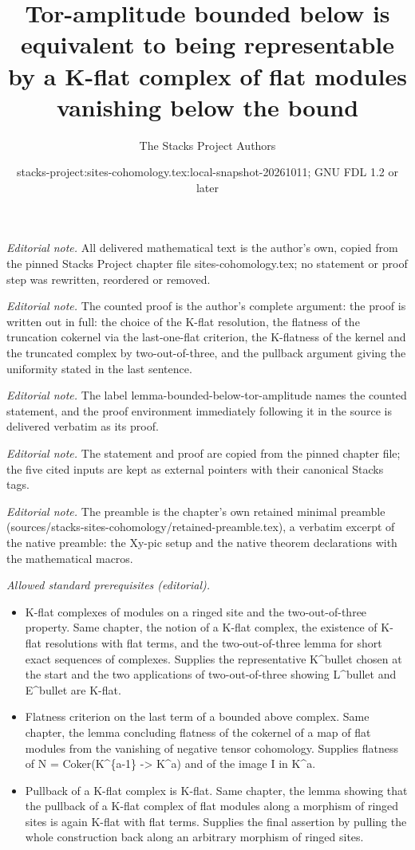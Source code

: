 \documentclass[10pt,a4paper]{amsart}
\title{Tor-amplitude bounded below is equivalent to being representable by a K-flat complex of flat modules vanishing below the bound}
\author{The Stacks Project Authors}
\date{stacks-project:sites-cohomology.tex:local-snapshot-20261011; GNU FDL 1.2 or later}
\theoremstyle{plain}
\theoremstyle{definition}
\theoremstyle{remark}
\numberwithin{equation}{subsection}
\begin{document}
\maketitle
\noindent\textit{Editorial note.} All delivered mathematical text is the author's own, copied from the pinned Stacks Project chapter file sites-cohomology.tex; no statement or proof step was rewritten, reordered or removed.\par\medskip
\noindent\textit{Editorial note.} The counted proof is the author's complete argument: the proof is written out in full: the choice of the K-flat resolution, the flatness of the truncation cokernel via the last-one-flat criterion, the K-flatness of the kernel and the truncated complex by two-out-of-three, and the pullback argument giving the uniformity stated in the last sentence.\par\medskip
\noindent\textit{Editorial note.} The label lemma-bounded-below-tor-amplitude names the counted statement, and the proof environment immediately following it in the source is delivered verbatim as its proof.\par\medskip
\noindent\textit{Editorial note.} The statement and proof are copied from the pinned chapter file; the five cited inputs are kept as external pointers with their canonical Stacks tags.\par\medskip
\noindent\textit{Editorial note.} The preamble is the chapter's own retained minimal preamble (sources/stacks-sites-cohomology/retained-preamble.tex), a verbatim excerpt of the native preamble: the Xy-pic setup and the native theorem declarations with the mathematical macros.\par\medskip
\noindent\textit{Allowed standard prerequisites (editorial).}\begin{itemize}
\item K-flat complexes of modules on a ringed site and the two-out-of-three property. Same chapter, the notion of a K-flat complex, the existence of K-flat resolutions with flat terms, and the two-out-of-three lemma for short exact sequences of complexes. Supplies the representative K\textasciicircum{}bullet chosen at the start and the two applications of two-out-of-three showing L\textasciicircum{}bullet and E\textasciicircum{}bullet are K-flat.
\item Flatness criterion on the last term of a bounded above complex. Same chapter, the lemma concluding flatness of the cokernel of a map of flat modules from the vanishing of negative tensor cohomology. Supplies flatness of N = Coker(K\textasciicircum{}\{a-1\} -> K\textasciicircum{}a) and of the image I in K\textasciicircum{}a.
\item Pullback of a K-flat complex is K-flat. Same chapter, the lemma showing that the pullback of a K-flat complex of flat modules along a morphism of ringed sites is again K-flat with flat terms. Supplies the final assertion by pulling the whole construction back along an arbitrary morphism of ringed sites.
\end{itemize}\medskip
\end{document}

